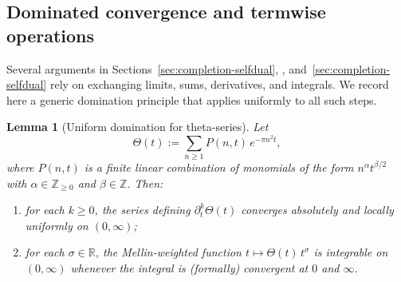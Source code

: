 \documentclass[11pt]{amsart}
\newtheorem{lemma}[theorem]{Lemma}
\theoremstyle{definition}
\theoremstyle{remark}
\newcommand{\Z}{\mathbb{Z}}
\begin{document}
\subsection{Dominated convergence and termwise operations}
\label{app:dominated}

Several arguments in Sections~\ref{sec:completion-selfdual},
\cite{PaperI}, and~\ref{sec:completion-selfdual} rely on exchanging
limits, sums, derivatives, and integrals. We record here a generic domination
principle that applies uniformly to all such steps.

\begin{lemma}[Uniform domination for theta-series]
\label{lem:theta-domination}
Let
\[
\Theta(t):=\sum_{n\ge1} P(n,t)\,e^{-\pi n^2 t},
\]
where $P(n,t)$ is a finite linear combination of monomials of the form
$n^{\alpha}t^{\beta/2}$ with $\alpha\in\Z_{\ge0}$ and $\beta\in\Z$.
Then:
\begin{enumerate}[label=(\roman*)]
\item for each $k\ge0$, the series defining $\partial_t^k\Theta(t)$ converges
absolutely and locally uniformly on $(0,\infty)$;
\item for each $\sigma\in\mathbb R$, the Mellin-weighted function
$t\mapsto \Theta(t)\,t^{\sigma}$ is integrable on $(0,\infty)$ whenever the integral
is (formally) convergent at $0$ and $\infty$.
\end{enumerate}
\end{lemma}
\end{document}
